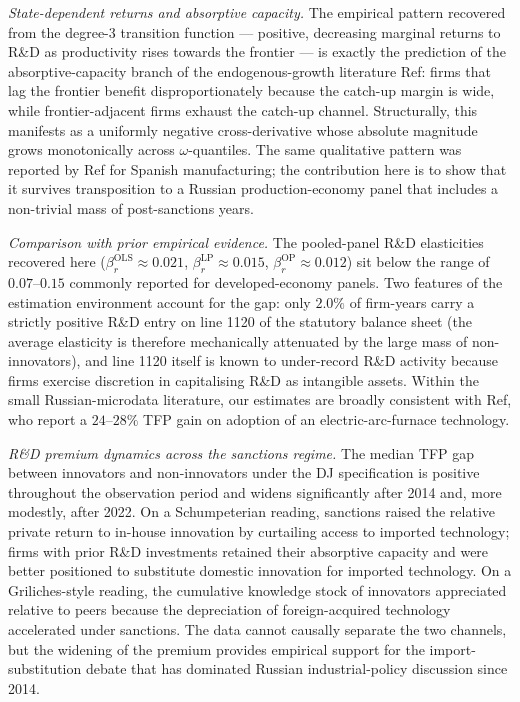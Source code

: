 \documentclass[a4paper, 12pt]{article}
\def\textcite#1{Ref}%
\def\parencite#1{Ref}%
\begin{document}
\emph{State-dependent returns and absorptive capacity.} The empirical pattern recovered from the degree-3 transition function --- positive, decreasing marginal returns to R\&D as productivity rises towards the frontier --- is exactly the prediction of the absorptive-capacity branch of the endogenous-growth literature \parencite{Audretsch2020The}: firms that lag the frontier benefit disproportionately because the catch-up margin is wide, while frontier-adjacent firms exhaust the catch-up channel. Structurally, this manifests as a uniformly negative cross-derivative whose absolute magnitude grows monotonically across $\omega$-quantiles. The same qualitative pattern was reported by \textcite{doraszelski2013r} for Spanish manufacturing; the contribution here is to show that it survives transposition to a Russian production-economy panel that includes a non-trivial mass of post-sanctions years.

\emph{Comparison with prior empirical evidence.} The pooled-panel R\&D elasticities recovered here ($\beta_r^{\text{OLS}} \approx 0.021$, $\beta_r^{\text{LP}} \approx 0.015$, $\beta_r^{\text{OP}} \approx 0.012$) sit below the range of $0.07$--$0.15$ commonly reported for developed-economy panels. Two features of the estimation environment account for the gap: only $2.0\%$ of firm-years carry a strictly positive R\&D entry on line 1120 of the statutory balance sheet (the average elasticity is therefore mechanically attenuated by the large mass of non-innovators), and line 1120 itself is known to under-record R\&D activity because firms exercise discretion in capitalising R\&D as intangible assets. Within the small Russian-microdata literature, our estimates are broadly consistent with \textcite{malein2019total}, who report a $24$--$28\%$ TFP gain on adoption of an electric-arc-furnace technology.

\emph{R\&D premium dynamics across the sanctions regime.} The median TFP gap between innovators and non-innovators under the DJ specification is positive throughout the observation period and widens significantly after 2014 and, more modestly, after 2022. On a Schumpeterian reading, sanctions raised the relative private return to in-house innovation by curtailing access to imported technology; firms with prior R\&D investments retained their absorptive capacity and were better positioned to substitute domestic innovation for imported technology. On a Griliches-style reading, the cumulative knowledge stock of innovators appreciated relative to peers because the depreciation of foreign-acquired technology accelerated under sanctions. The data cannot causally separate the two channels, but the widening of the premium provides empirical support for the import-substitution debate that has dominated Russian industrial-policy discussion since 2014.
\end{document}
